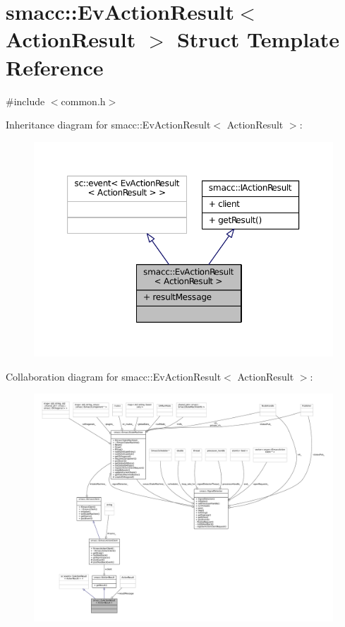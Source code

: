 \hypertarget{structsmacc_1_1EvActionResult}{}\section{smacc\+:\+:Ev\+Action\+Result$<$ Action\+Result $>$ Struct Template Reference}
\label{structsmacc_1_1EvActionResult}


{\ttfamily \#include $<$common.\+h$>$}



Inheritance diagram for smacc\+:\+:Ev\+Action\+Result$<$ Action\+Result $>$\+:
\nopagebreak
\begin{figure}[H]
\begin{center}
\leavevmode
\includegraphics[width=350pt]{structsmacc_1_1EvActionResult__inherit__graph}
\end{center}
\end{figure}


Collaboration diagram for smacc\+:\+:Ev\+Action\+Result$<$ Action\+Result $>$\+:
\nopagebreak
\begin{figure}[H]
\begin{center}
\leavevmode
\includegraphics[width=350pt]{structsmacc_1_1EvActionResult__coll__graph}
\end{center}
\end{figure}
